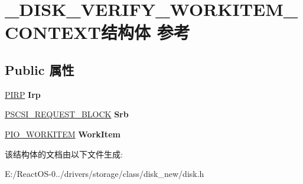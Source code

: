 \hypertarget{struct___d_i_s_k___v_e_r_i_f_y___w_o_r_k_i_t_e_m___c_o_n_t_e_x_t}{}\section{\+\_\+\+D\+I\+S\+K\+\_\+\+V\+E\+R\+I\+F\+Y\+\_\+\+W\+O\+R\+K\+I\+T\+E\+M\+\_\+\+C\+O\+N\+T\+E\+X\+T结构体 参考}
\label{struct___d_i_s_k___v_e_r_i_f_y___w_o_r_k_i_t_e_m___c_o_n_t_e_x_t}
\subsection*{Public 属性}
\begin{DoxyCompactItemize}
\item 
\mbox{\label{struct___d_i_s_k___v_e_r_i_f_y___w_o_r_k_i_t_e_m___c_o_n_t_e_x_t_a3c795e0f33de12f08e6c6174f001ee5f}} 
\hyperlink{interfacevoid}{P\+I\+RP} {\bfseries Irp}
\item 
\mbox{\label{struct___d_i_s_k___v_e_r_i_f_y___w_o_r_k_i_t_e_m___c_o_n_t_e_x_t_a3ea3588e35903a5da884eb3d5f30c3f9}} 
\hyperlink{struct___s_c_s_i___r_e_q_u_e_s_t___b_l_o_c_k}{P\+S\+C\+S\+I\+\_\+\+R\+E\+Q\+U\+E\+S\+T\+\_\+\+B\+L\+O\+CK} {\bfseries Srb}
\item 
\mbox{\label{struct___d_i_s_k___v_e_r_i_f_y___w_o_r_k_i_t_e_m___c_o_n_t_e_x_t_ae162bd30f7ba205838c9b64fd6df2b17}} 
\hyperlink{struct___i_o___w_o_r_k_i_t_e_m}{P\+I\+O\+\_\+\+W\+O\+R\+K\+I\+T\+EM} {\bfseries Work\+Item}
\end{DoxyCompactItemize}


该结构体的文档由以下文件生成\+:\begin{DoxyCompactItemize}
\item 
E\+:/\+React\+O\+S-\/0../drivers/storage/class/disk\+\_\+new/disk.\+h\end{DoxyCompactItemize}
